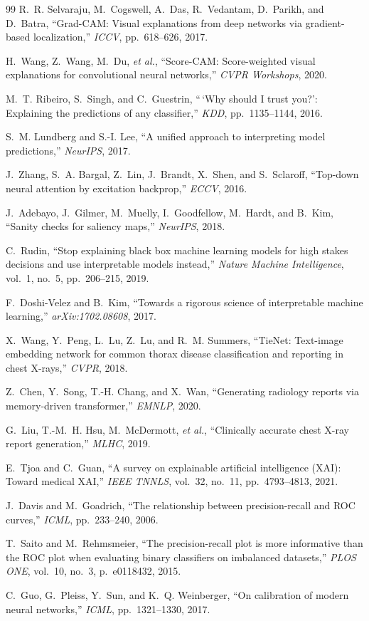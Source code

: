 \documentclass[conference]{IEEEtran}
\begin{document}
\begin{thebibliography}{99}
R.~R. Selvaraju, M.~Cogswell, A.~Das, R.~Vedantam, D.~Parikh, and D.~Batra,
``Grad-CAM: Visual explanations from deep networks via gradient-based
localization,'' \emph{ICCV}, pp.~618--626, 2017.

H.~Wang, Z.~Wang, M.~Du, \emph{et al.},
``Score-CAM: Score-weighted visual explanations for convolutional neural
networks,'' \emph{CVPR Workshops}, 2020.

M.~T. Ribeiro, S.~Singh, and C.~Guestrin,
``\,`Why should I trust you?': Explaining the predictions of any classifier,''
\emph{KDD}, pp.~1135--1144, 2016.

S.~M. Lundberg and S.-I. Lee,
``A unified approach to interpreting model predictions,'' \emph{NeurIPS}, 2017.

J.~Zhang, S.~A. Bargal, Z.~Lin, J.~Brandt, X.~Shen, and S.~Sclaroff,
``Top-down neural attention by excitation backprop,'' \emph{ECCV}, 2016.

J.~Adebayo, J.~Gilmer, M.~Muelly, I.~Goodfellow, M.~Hardt, and B.~Kim,
``Sanity checks for saliency maps,'' \emph{NeurIPS}, 2018.

C.~Rudin,
``Stop explaining black box machine learning models for high stakes decisions and
use interpretable models instead,'' \emph{Nature Machine Intelligence}, vol.~1,
no.~5, pp.~206--215, 2019.

F.~Doshi-Velez and B.~Kim,
``Towards a rigorous science of interpretable machine learning,''
\emph{arXiv:1702.08608}, 2017.

X.~Wang, Y.~Peng, L.~Lu, Z.~Lu, and R.~M. Summers,
``TieNet: Text-image embedding network for common thorax disease classification and
reporting in chest X-rays,'' \emph{CVPR}, 2018.

Z.~Chen, Y.~Song, T.-H. Chang, and X.~Wan,
``Generating radiology reports via memory-driven transformer,'' \emph{EMNLP}, 2020.

G.~Liu, T.-M.~H. Hsu, M.~McDermott, \emph{et al.},
``Clinically accurate chest X-ray report generation,'' \emph{MLHC}, 2019.

E.~Tjoa and C.~Guan,
``A survey on explainable artificial intelligence (XAI): Toward medical XAI,''
\emph{IEEE TNNLS}, vol.~32, no.~11, pp.~4793--4813, 2021.

J.~Davis and M.~Goadrich,
``The relationship between precision-recall and ROC curves,'' \emph{ICML},
pp.~233--240, 2006.

T.~Saito and M.~Rehmsmeier,
``The precision-recall plot is more informative than the ROC plot when evaluating
binary classifiers on imbalanced datasets,'' \emph{PLOS ONE}, vol.~10, no.~3,
p.~e0118432, 2015.

C.~Guo, G.~Pleiss, Y.~Sun, and K.~Q. Weinberger,
``On calibration of modern neural networks,'' \emph{ICML}, pp.~1321--1330, 2017.

\end{thebibliography}
\end{document}
